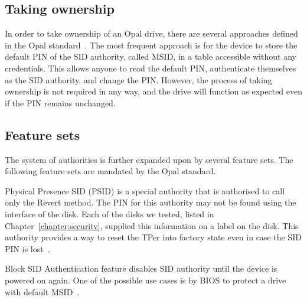 \subsection{Taking ownership}

In order to take ownership of an Opal drive, there are several approaches defined in the Opal standard~\cite{tcg-opal2}. The most frequent approach is for the device to store the default PIN of the SID authority, called MSID, in a table accessible without any credentials. This allows anyone to read the default PIN, authenticate themselves as the SID authority, and change the PIN. However, the process of taking ownership is not required in any way, and the drive will function as expected even if the PIN remains unchanged.



\subsection{Feature sets}

The system of authorities is further expanded upon by several feature sets.
The following feature sets are mandated by the Opal standard.

Physical Presence SID (PSID) is a special authority that is authorised to call only the Revert method. The PIN for this authority may not be found using the interface of the disk. 
Each of the disks we tested, listed in Chapter~\ref{chapter:security}, supplied this information on a label on the disk. This authority provides a way to reset the TPer into factory state even in case the SID PIN is lost~\cite{tcg-psid}.

Block SID Authentication feature disables SID authority until the device is powered on again. One of the possible use cases is by BIOS to protect a drive with default MSID~\cite{tcg-block-sid-auth}.


